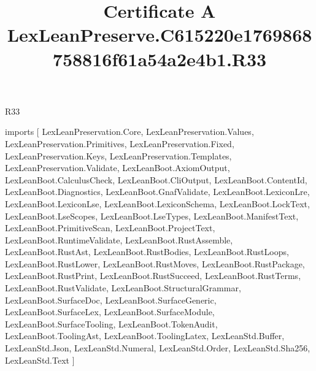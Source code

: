 \begin{lexlean}{R33}
\title{Certificate A LexLeanPreserve.C615220e1769868758816f61a54a2e4b1.R33}
\begin{coremodule}
imports [
  LexLeanPreservation.Core,
  LexLeanPreservation.Values,
  LexLeanPreservation.Primitives,
  LexLeanPreservation.Fixed,
  LexLeanPreservation.Keys,
  LexLeanPreservation.Templates,
  LexLeanPreservation.Validate,
  LexLeanBoot.AxiomOutput,
  LexLeanBoot.CalculusCheck,
  LexLeanBoot.CliOutput,
  LexLeanBoot.ContentId,
  LexLeanBoot.Diagnostics,
  LexLeanBoot.GnafValidate,
  LexLeanBoot.LexiconLre,
  LexLeanBoot.LexiconLse,
  LexLeanBoot.LexiconSchema,
  LexLeanBoot.LockText,
  LexLeanBoot.LseScopes,
  LexLeanBoot.LseTypes,
  LexLeanBoot.ManifestText,
  LexLeanBoot.PrimitiveScan,
  LexLeanBoot.ProjectText,
  LexLeanBoot.RuntimeValidate,
  LexLeanBoot.RustAssemble,
  LexLeanBoot.RustAst,
  LexLeanBoot.RustBodies,
  LexLeanBoot.RustLoops,
  LexLeanBoot.RustLower,
  LexLeanBoot.RustMoves,
  LexLeanBoot.RustPackage,
  LexLeanBoot.RustPrint,
  LexLeanBoot.RustSucceed,
  LexLeanBoot.RustTerms,
  LexLeanBoot.RustValidate,
  LexLeanBoot.StructuralGrammar,
  LexLeanBoot.SurfaceDoc,
  LexLeanBoot.SurfaceGeneric,
  LexLeanBoot.SurfaceLex,
  LexLeanBoot.SurfaceModule,
  LexLeanBoot.SurfaceTooling,
  LexLeanBoot.TokenAudit,
  LexLeanBoot.ToolingAst,
  LexLeanBoot.ToolingLatex,
  LexLeanStd.Buffer,
  LexLeanStd.Json,
  LexLeanStd.Numeral,
  LexLeanStd.Order,
  LexLeanStd.Sha256,
  LexLeanStd.Text
]


\end{coremodule}
\end{lexlean}
